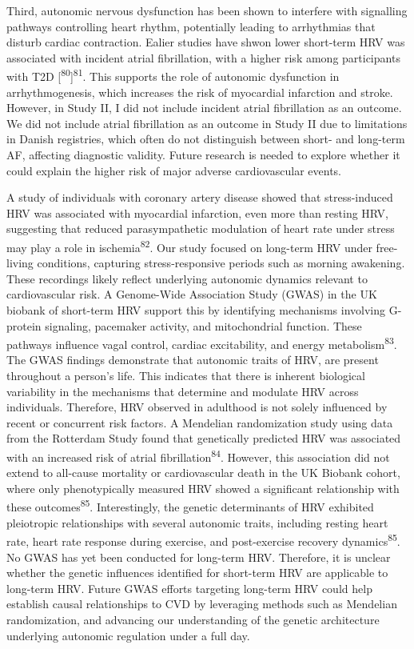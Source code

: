 \documentclass[
  a4paper,
  headsepline=true,
  open=any]{scrbook}
\begin{document}
Third, autonomic nervous dysfunction has been shown to interfere with
signalling pathways controlling heart rhythm, potentially leading to
arrhythmias that disturb cardiac contraction. Ealier studies have shwon
lower short-term HRV was associated with incident atrial fibrillation,
with a higher risk among participants with T2D
{[}\textsuperscript{80}{]}\textsuperscript{81}. This supports the role
of autonomic dysfunction in arrhythmogenesis, which increases the risk
of myocardial infarction and stroke. However, in Study II, I did not
include incident atrial fibrillation as an outcome. We did not include
atrial fibrillation as an outcome in Study II due to limitations in
Danish registries, which often do not distinguish between short- and
long-term AF, affecting diagnostic validity. Future research is needed
to explore whether it could explain the higher risk of major adverse
cardiovascular events.

A study of individuals with coronary artery disease showed that
stress-induced HRV was associated with myocardial infarction, even more
than resting HRV, suggesting that reduced parasympathetic modulation of
heart rate under stress may play a role in ischemia\textsuperscript{82}.
Our study focused on long-term HRV under free-living conditions,
capturing stress-responsive periods such as morning awakening. These
recordings likely reflect underlying autonomic dynamics relevant to
cardiovascular risk. A Genome-Wide Association Study (GWAS) in the UK
biobank of short-term HRV support this by identifying mechanisms
involving G-protein signaling, pacemaker activity, and mitochondrial
function. These pathways influence vagal control, cardiac excitability,
and energy metabolism\textsuperscript{83}. The GWAS findings demonstrate
that autonomic traits of HRV, are present throughout a person's life.
This indicates that there is inherent biological variability in the
mechanisms that determine and modulate HRV across individuals.
Therefore, HRV observed in adulthood is not solely influenced by recent
or concurrent risk factors. A Mendelian randomization study using data
from the Rotterdam Study found that genetically predicted HRV was
associated with an increased risk of atrial
fibrillation\textsuperscript{84}. However, this association did not
extend to all-cause mortality or cardiovascular death in the UK Biobank
cohort, where only phenotypically measured HRV showed a significant
relationship with these outcomes\textsuperscript{85}. Interestingly, the
genetic determinants of HRV exhibited pleiotropic relationships with
several autonomic traits, including resting heart rate, heart rate
response during exercise, and post-exercise recovery
dynamics\textsuperscript{85}. No GWAS has yet been conducted for
long-term HRV. Therefore, it is unclear whether the genetic influences
identified for short-term HRV are applicable to long-term HRV. Future
GWAS efforts targeting long-term HRV could help establish causal
relationships to CVD by leveraging methods such as Mendelian
randomization, and advancing our understanding of the genetic
architecture underlying autonomic regulation under a full day.
\end{document}
